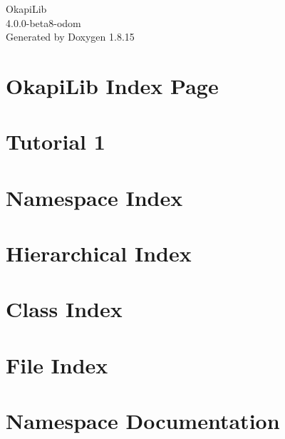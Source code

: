 \let\mypdfximage\pdfximage\def\pdfximage{\immediate\mypdfximage}\documentclass[twoside]{book}
\newcommand{\+}{\discretionary{\mbox{\scriptsize$\hookleftarrow$}}{}{}}
\newcommand{\clearemptydoublepage}{%
  \newpage{\pagestyle{empty}\cleardoublepage}%
}
\begin{document}
\hypersetup{pageanchor=false,
             bookmarksnumbered=true,
             pdfencoding=unicode
            }
\begin{titlepage}
\vspace*{7cm}
\begin{center}%
{\Large Okapi\+Lib \\[1ex]\large 4.\+0.\+0-\/beta8-\/odom }\\
\vspace*{1cm}
{\large Generated by Doxygen 1.8.15}\\
\end{center}
\end{titlepage}
\clearemptydoublepage
{}
\tableofcontents
\clearemptydoublepage
{}
\hypersetup{pageanchor=true}

\chapter{Okapi\+Lib Index Page}
\label{index}\hypertarget{index}{}
\chapter{Tutorial 1}
\label{md_doc_Tutorial1}

\chapter{Namespace Index}

\chapter{Hierarchical Index}

\chapter{Class Index}

\chapter{File Index}

\chapter{Namespace Documentation}


\end{document}
